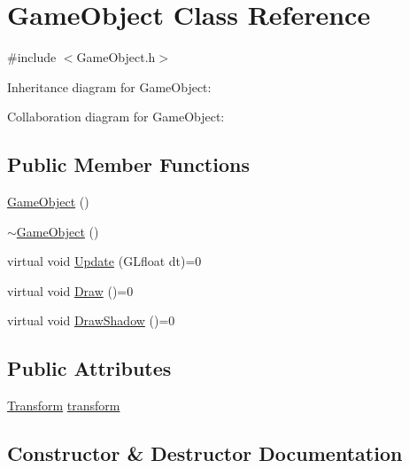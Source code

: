 \hypertarget{class_game_object}{}\section{Game\+Object Class Reference}
\label{class_game_object}


{\ttfamily \#include $<$Game\+Object.\+h$>$}



Inheritance diagram for Game\+Object\+:


Collaboration diagram for Game\+Object\+:
\subsection*{Public Member Functions}
\begin{DoxyCompactItemize}
\item 
\mbox{\hyperlink{class_game_object_a0348e3ee2e83d56eafca7a3547f432c4}{Game\+Object}} ()
\item 
\mbox{\hyperlink{class_game_object_ab82dfdb656f9051c0587e6593b2dda97}{$\sim$\+Game\+Object}} ()
\item 
virtual void \mbox{\hyperlink{class_game_object_aa100c768006aca3e7cdbabe27b48b9e5}{Update}} (G\+Lfloat dt)=0
\item 
virtual void \mbox{\hyperlink{class_game_object_a29a665f46fda87982825bc5c0ca6a888}{Draw}} ()=0
\item 
virtual void \mbox{\hyperlink{class_game_object_a78bf45c8ef3805247435583556087788}{Draw\+Shadow}} ()=0
\end{DoxyCompactItemize}
\subsection*{Public Attributes}
\begin{DoxyCompactItemize}
\item 
\mbox{\hyperlink{class_transform}{Transform}} \mbox{\hyperlink{class_game_object_ad2de7705e8d1d7b5d0014448dd13f99a}{transform}}
\end{DoxyCompactItemize}


\subsection{Constructor \& Destructor Documentation}
\mbox{\label{class_game_object_a0348e3ee2e83d56eafca7a3547f432c4}} 
